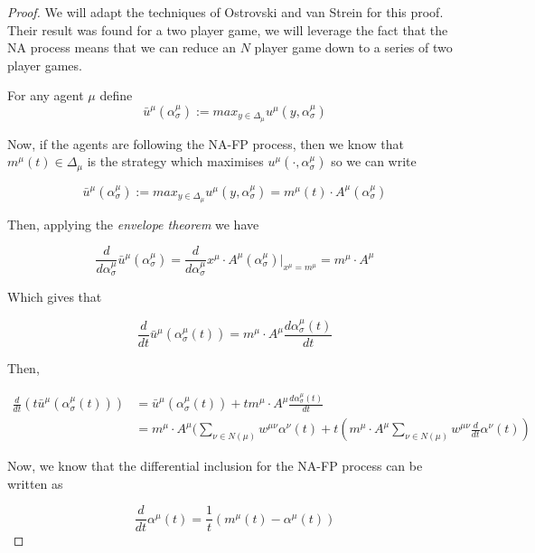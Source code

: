\documentclass{article}
\theoremstyle{definition}
\begin{document}
	\begin{proof}
		We will adapt the techniques of Ostrovski and van Strein for this proof. Their result was found for a two player game, we will leverage the fact that the NA process means that we can reduce an $N$ player game down to a series of two player games. 
		
		For any agent $\mu$ define
		\begin{equation}
			\bar{u}^\mu (\alpha_\sigma^\mu) := max_{y \in \Delta_\mu} u^\mu(y, \alpha_\sigma^\mu)
		\end{equation}

		Now, if the agents are following the NA-FP process, then we know that $m^\mu (t) \in \Delta_\mu$ is the strategy which maximises $u^\mu( \cdot, \alpha_\sigma^\mu)$ so we can write 

		\begin{equation}
			\bar{u}^\mu (\alpha_\sigma^\mu) := max_{y \in \Delta_\mu} u^\mu(y, \alpha_\sigma^\mu) = m^\mu(t) \cdot A^\mu (\alpha_\sigma^\mu)
		\end{equation}

		Then, applying the \emph{envelope theorem} we have

		\begin{equation}
			\frac{d}{d \alpha_\sigma^\mu} \bar{u}^\mu (\alpha_\sigma^\mu) = \frac{d}{d \alpha_\sigma^\mu} x^\mu \cdot A^\mu (\alpha_\sigma^\mu) \Big |_{x^\mu = m^\mu} = m^\mu \cdot A^\mu
		\end{equation}

		Which gives that 

		\begin{equation}
			\frac{d}{dt} \bar{u}^\mu (\alpha_\sigma^\mu (t)) = m^\mu \cdot A^\mu \frac{d \alpha_\sigma^\mu (t)}{dt}
		\end{equation}

		Then, 

		\begin{align}
			\frac{d}{dt} (t \bar{u}^\mu (\alpha_\sigma^\mu (t))) & =  \bar{u}^\mu (\alpha_\sigma^\mu (t)) + t m^\mu \cdot A^\mu \frac{d \alpha_\sigma^\mu (t)}{dt} \\
			& = m^\mu \cdot A^\mu (\sum_{\nu \in N(\mu)} w^{\mu \nu} \alpha^\nu (t) + t (m^\mu \cdot A^\mu \sum_{\nu \in N(\mu)} w^{\mu \nu} \frac{d}{dt} \alpha^\nu(t))
		\end{align} 

		Now, we know that the differential inclusion for the NA-FP process can be written as

		\begin{equation}
			\frac{d}{dt} \alpha^\mu (t) = \frac{1}{t} (m^\mu(t) - \alpha^\mu (t))
		\end{equation}


\end{proof}
\end{document}
